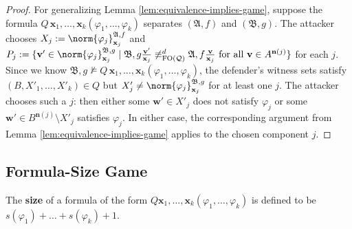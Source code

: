 \documentclass{article}
\theoremstyle{definition}
\begin{document}
\begin{proof}
    For generalizing Lemma \ref{lem:equivalence-implies-game}, suppose the formula $Q\,\mathbf{x}_1,\ldots,\mathbf{x}_k(\varphi_1,\ldots,\varphi_k)$ separates $(\mathfrak{A},f)$ and $(\mathfrak{B},g)$. The attacker chooses $X_j:=\norm{\varphi_j}^{\mathfrak{A},f}_{\mathbf{x}_j}$ and $P_j:=\{\mathbf{v}'\in \norm{\varphi_j}^{\mathfrak{B},g}_{\mathbf{x}_j}\mid \mathfrak{B},g\frac{\mathbf{v}'}{\mathbf{x}_j} \not\equiv^d_{\mathrm{FO}(\mathcal{Q})} \mathfrak{A},f\frac{\mathbf{v}}{\mathbf{x}_j}\text{ for all } \mathbf{v}\in A^{\mathbf{n}(j)}\}$ for each $j$. Since we know $\mathfrak{B},g\not\models Q\,\mathbf{x}_1,\ldots,\mathbf{x}_k(\varphi_1,\ldots,\varphi_k)$, the defender's witness sets satisfy $(B,X'_1,\ldots,X'_k)\in Q$ but $X'_j\neq \norm{\varphi_j}^{\mathfrak{B},g}_{\mathbf{x}_j}$ for at least one $j$. The attacker chooses such a $j$: then either some $\mathbf{w}'\in X'_j$ does not satisfy $\varphi_j$ or some $\mathbf{w}'\in B^{\mathbf{n}(j)}\setminus X'_j$ satisfies $\varphi_j$. In either case, the corresponding argument from Lemma \ref{lem:equivalence-implies-game} applies to the chosen component $j$.
\end{proof}

\subsection{Formula-Size Game}

The \textbf{size} of a formula of the form $Q \textbf{x}_1,\dots,\textbf{x}_k(\varphi_1,\dots,\varphi_k)$ is defined to be $s(\varphi_1)+\dots+s(\varphi_k)+1$.
\end{document}
